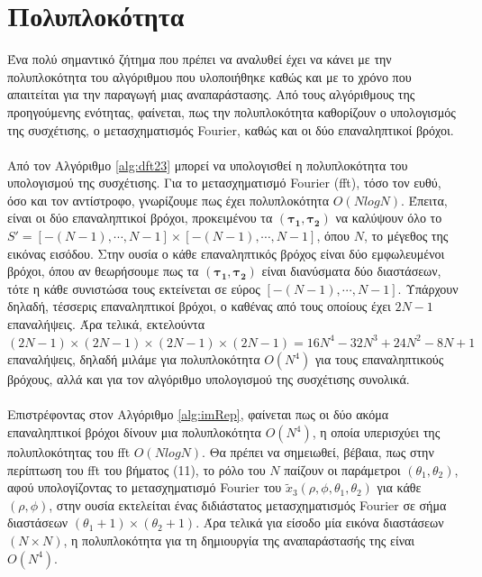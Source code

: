 


\section{Πολυπλοκότητα}
Ένα πολύ σημαντικό ζήτημα που πρέπει να αναλυθεί έχει να κάνει με την πολυπλοκότητα του αλγόριθμου που υλοποιήθηκε καθώς και με το χρόνο που απαιτείται για την παραγωγή μιας αναπαράστασης. Από τους αλγόριθμους της προηγούμενης ενότητας, φαίνεται, πως την πολυπλοκότητα καθορίζουν ο υπολογισμός της συσχέτισης, ο μετασχηματισμός Fourier, καθώς και οι δύο επαναληπτικοί βρόχοι.

\paragraph*{}
Από τον Αλγόριθμο \ref{alg:dft23} μπορεί να υπολογισθεί η πολυπλοκότητα του υπολογισμού της συσχέτισης. Για το μετασχηματισμό Fourier (fft), τόσο τον ευθύ, όσο και τον αντίστροφο, γνωρίζουμε πως έχει πολυπλοκότητα $O(NlogN)$. Έπειτα, είναι οι δύο επαναληπτικοί βρόχοι, προκειμένου τα $(\boldsymbol{\tau_1}, \boldsymbol{\tau_2})$ να καλύψουν όλο το $S'=[-(N-1), \cdots ,N-1]\times[-(N-1), \cdots ,N-1]$, όπου $N$, το μέγεθος της εικόνας εισόδου. Στην ουσία ο κάθε επαναληπτικός βρόχος είναι δύο εμφωλευμένοι βρόχοι, όπου αν θεωρήσουμε πως τα $(\boldsymbol{\tau_1}, \boldsymbol{\tau_2})$ είναι διανύσματα δύο διαστάσεων, τότε η κάθε συνιστώσα τους εκτείνεται σε εύρος $[-(N-1), \cdots ,N-1]$.  Υπάρχουν δηλαδή, τέσσερις επαναληπτικοί βρόχοι, ο καθένας από τους οποίους έχει $2N - 1$ επαναλήψεις. Άρα τελικά, εκτελούντα $(2N - 1)\times(2N - 1)\times(2N - 1)\times(2N - 1) = 16N^4 - 32N^3 + 24N^2 - 8N + 1$ επαναλήψεις, δηλαδή μιλάμε για πολυπλοκότητα $O(N^4)$ για τους επαναληπτικούς βρόχους, αλλά και για τον αλγόριθμο υπολογισμού της συσχέτισης συνολικά.

\paragraph*{}
Επιστρέφοντας στον Αλγόριθμο \ref{alg:imRep}, φαίνεται πως οι δύο ακόμα επαναληπτικοί βρόχοι δίνουν μια πολυπλοκότητα $O(N^4)$, η οποία υπερισχύει της πολυπλοκότητας του fft $O(NlogN)$. Θα πρέπει να σημειωθεί, βέβαια, πως στην περίπτωση του fft του βήματος (11), το ρόλο του $N$ παίζουν οι παράμετροι $(\theta_1, \theta_2)$, αφού υπολογίζοντας το μετασχηματισμό Fourier του $\tilde{x}_3(\rho, \phi, \theta_1, \theta_2)$ για κάθε $(\rho, \phi)$, στην ουσία εκτελείται ένας διδιάστατος μετασχηματισμός Fourier σε σήμα διαστάσεων $(\theta_1 + 1)\times (\theta_2 + 1)$. Άρα τελικά για είσοδο μία εικόνα διαστάσεων $(N \times N)$, η πολυπλοκότητα για τη δημιουργία της αναπαράστασής της είναι $O(N^4)$.

